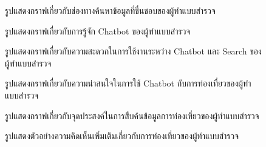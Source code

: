 \documentclass[12pt,oneside,openright,a4paper]{cpe-thai-project}
\begin{document}
\begin{figure}[!h]\centering
\setlength{\fboxrule}{0mm}
\caption{รูปแสดงกราฟเกี่ยวกับช่องทางค้นหาข้อมูลที่ชื่นชอบของผู้ทำแบบสำรวจ}\label{fig:Fก.19}
\end{figure}

\begin{figure}[!h]\centering
\setlength{\fboxrule}{0mm}
\caption{รูปแสดงกราฟเกี่ยวกับการรู้จัก Chatbot ของผู้ทำแบบสำรวจ}\label{fig:Fก.20}
\end{figure}

\begin{figure}[!h]\centering
\setlength{\fboxrule}{0mm}
\caption{รูปแสดงกราฟเกี่ยวกับความสะดวกในการใช้งานระหว่าง Chatbot และ Search ของผู้ทำแบบสำรวจ}\label{fig:Fก.21}
\end{figure}

\begin{figure}[!h]\centering
\setlength{\fboxrule}{0mm}
\caption{รูปแสดงกราฟเกี่ยวกับความน่าสนใจในการใช้ Chatbot กับการท่องเที่ยวของผู้ทำแบบสำรวจ}\label{fig:Fก.22}
\end{figure}

\begin{figure}[!h]\centering
\setlength{\fboxrule}{0mm}
\caption{รูปแสดงกราฟเกี่ยวกับจุดประสงค์ในการสืบค้นข้อมูลการท่องเที่ยวของผู้ทำแบบสำรวจ}\label{fig:Fก.23}
\end{figure}

\begin{figure}[!h]\centering
\setlength{\fboxrule}{0mm}
\caption{รูปแสดงตัวอย่างความคิดเห็นเพิ่มเติมเกี่ยวกับการท่องเที่ยวของผู้ทำแบบสำรวจ}\label{fig:Fก.24}
\end{figure}
\end{document}
